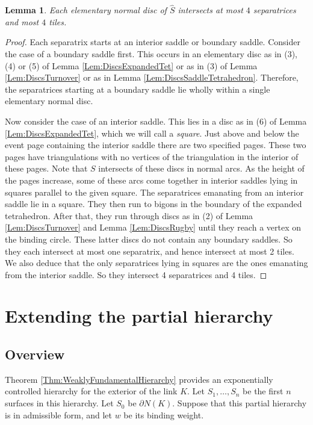 \documentclass[oneside]{amsart}
\numberwithin{equation}{section}
\theoremstyle{plain}
\newtheorem{lemma}[equation]{Lemma}
\theoremstyle{definition}
\begin{document}
\begin{lemma}
\label{Lem:AtMostTilesInElemDisc}
Each elementary normal disc of $\hat S$ intersects at most $4$ separatrices and most $4$ tiles.
\end{lemma}

\begin{proof}
Each separatrix starts at an interior saddle or boundary saddle. Consider the case of a boundary saddle first. This occurs in an elementary disc
as in (3), (4) or (5) of Lemma \ref{Lem:DiscsExpandedTet} or as in (3) of Lemma \ref{Lem:DiscsTurnover} or as in Lemma \ref{Lem:DiscsSaddleTetrahedron}. 
Therefore, the separatrices starting at a boundary saddle lie wholly within a single elementary normal disc.

Now consider the case of an interior saddle. This lies in a disc as in (6) of Lemma \ref{Lem:DiscsExpandedTet}, which we will call a \emph{square}.
 Just above and below the event page containing the interior saddle there
are two specified pages. These two pages have triangulations
with no vertices of the triangulation in the interior of these pages. Note that $S$ intersects of these discs in normal arcs.
As the height of the pages increase, some of these arcs come together in interior saddles lying in squares parallel to the given square. 
The separatrices emanating from an interior saddle lie in a square. They then run to bigons in the
boundary of the expanded tetrahedron. After that, they run through discs as in (2) of Lemma \ref{Lem:DiscsTurnover} and
Lemma \ref{Lem:DiscsRugby} until they reach a vertex on the binding circle. These latter discs
do not contain any boundary saddles. So they each intersect at most one separatrix, and hence intersect
at most 2 tiles. We also deduce that the only separatrices lying in squares
are the ones emanating from the interior saddle. So they intersect 4 separatrices and 4 tiles.
\end{proof}

\section{Extending the partial hierarchy}
\label{Sec:ExtendingHierarchy}

\subsection{Overview}

Theorem \ref{Thm:WeaklyFundamentalHierarchy} provides an exponentially controlled hierarchy for the exterior of the link $K$.
Let $S_1, \dots, S_n$ be the first $n$ surfaces in this hierarchy.
Let $S_0$ be $\partial N(K)$. Suppose that this partial hierarchy is in admissible form,
and let $w$ be its binding weight.
\end{document}
